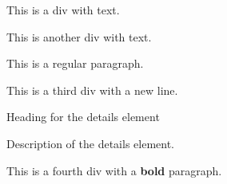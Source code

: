\documentclass[11pt,a4paper]{article}
\begin{document}
This is a div with text.

This is another div with text.

This is a regular paragraph.

This is a third div
with a new line.

Heading for the details element

Description of the details element.

This is a fourth div with a \textbf{bold} paragraph.
\end{document}
